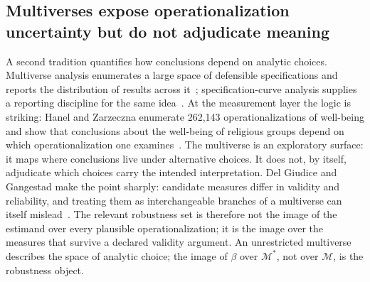 \documentclass[10pt,letterpaper]{article}
\newcommand{\M}{\ensuremath{\mathcal{M}}}
\begin{document}
\subsection{Multiverses expose operationalization uncertainty but do not adjudicate meaning}
A second tradition quantifies how conclusions depend on analytic choices.
Multiverse analysis enumerates a large space of defensible specifications and reports the distribution of results across it~\cite{steegen2016}; specification-curve analysis supplies a reporting discipline for the same idea~\cite{simonsohn2020}.
At the measurement layer the logic is striking: Hanel and Zarzeczna enumerate 262{,}143 operationalizations of well-being and show that conclusions about the well-being of religious groups depend on which operationalization one examines~\cite{hanelzarzeczna2023}.
The multiverse is an exploratory surface: it maps where conclusions live under alternative choices.
It does not, by itself, adjudicate which choices carry the intended interpretation.
Del Giudice and Gangestad make the point sharply: candidate measures differ in validity and reliability, and treating them as interchangeable branches of a multiverse can itself mislead~\cite{delgiudice2021}.
The relevant robustness set is therefore not the image of the estimand over every plausible operationalization; it is the image over the measures that survive a declared validity argument.
An unrestricted multiverse describes the space of analytic choice; the image of $\beta$ over $\M^*$, not over $\M$, is the robustness object.
\end{document}
